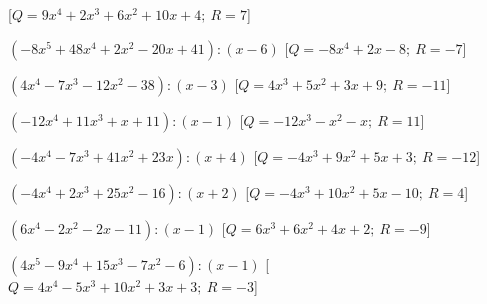 \begin{esercizio}
\begin{enumeratea}
   \hfill [\(Q = 9 x^4 +2 x^3 +6 x^2 +10 x +4;~R = 7\)]
  \item  \(\left(-8 x^5 +48 x^4 +2 x^2 -20 x +41 \right) : \left(x -6 \right)\)
   \hfill [\(Q = -8 x^4 +2 x -8;~R = -7\)]
  \item  \(\left(4 x^4 -7 x^3 -12 x^2 -38 \right) : \left(x -3 \right)\)
   \hfill [\(Q = 4 x^3 +5 x^2 +3 x +9;~R = -11\)]
  \item  \(\left(-12 x^4 +11 x^3 + x +11 \right) : \left(x -1 \right)\)
   \hfill [\(Q = -12 x^3 - x^2 - x ;~R = 11\)]
  \item  \(\left(-4 x^4 -7 x^3 +41 x^2 +23 x  \right) : \left(x +4 \right)\)
   \hfill [\(Q = -4 x^3 +9 x^2 +5 x +3;~R = -12\)]
  \item  \(\left(-4 x^4 +2 x^3 +25 x^2 -16 \right) : \left(x +2 \right)\)
   \hfill [\(Q = -4 x^3 +10 x^2 +5 x -10;~R = 4\)]
  \item  \(\left(6 x^4 -2 x^2 -2 x -11 \right) : \left(x -1 \right)\)
   \hfill [\(Q = 6 x^3 +6 x^2 +4 x +2;~R = -9\)]
  \item  \(\left(4 x^5 -9 x^4 +15 x^3 -7 x^2 -6 \right) : \left(x -1 \right)\)
   \hfill [\(Q = 4 x^4 -5 x^3 +10 x^2 +3 x +3;~R = -3\)]
 \end{enumeratea}
\end{esercizio}


